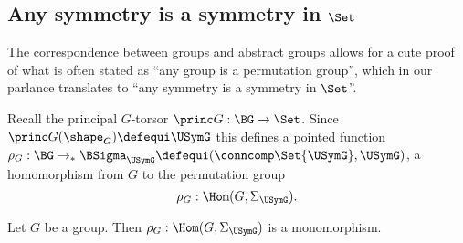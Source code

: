 \subsection{Any symmetry is a symmetry in $\Set$}
\label{sec:groupssubperm}


The correspondence between groups and abstract groups allows for a cute proof of what is often stated as ``any group is a permutation group'', which in our parlance translates to ``any symmetry is a symmetry in $\Set$''.

Recall the principal $G$-torsor $\princ G:\BG\to\Set$.
Since $\princ G(\shape_G)\defequi \USymG$ this defines a pointed function $\rho_G:\BG\to_* \BSigma_{\USymG}\defequi(\conncomp \Set {\USymG},\USymG)$,
 \ie a homomorphism from $G$ to the permutation group
$$\rho_G:\Hom(G,\Sigma_{\USymG}).$$
\begin{theorem}[Cayley]
  \label{lem:allgpsarepermutationgps}
  Let $G$ be a group. Then
  $\rho_G:\Hom(G,\Sigma_{\USymG})  $ is a monomorphism.
\end{theorem}
